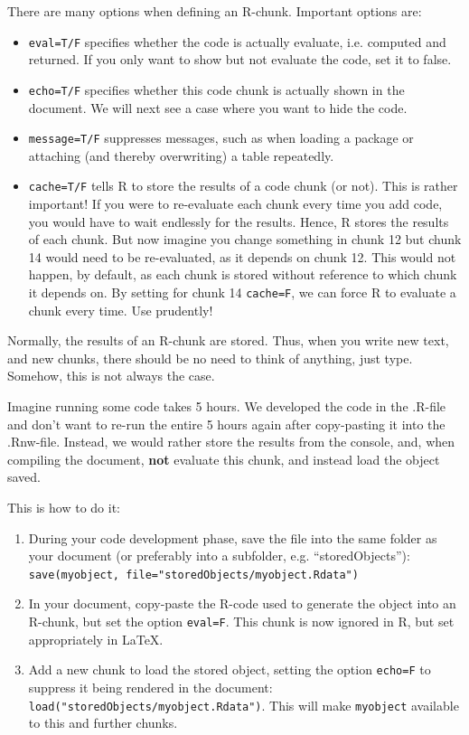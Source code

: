 \documentclass[a4paper, 11pt]{article}\usepackage[]{graphicx}\usepackage[]{color}
\begin{document}
There are many options when defining an R-chunk. Important options are:
\begin{itemize}
\item \texttt{eval=T/F} specifies whether the code is actually evaluate, i.e. computed and returned. If you only want to show but not evaluate the code, set it to false.
\item \texttt{echo=T/F} specifies whether this code chunk is actually shown in the document. We will next see a case where you want to hide the code.
\item \texttt{message=T/F} suppresses messages, such as when loading a package or attaching (and thereby overwriting) a table repeatedly.
\item \texttt{cache=T/F} tells R to store the results of a code chunk (or not). This is rather important! If you were to re-evaluate each chunk every time you add code, you would have to wait endlessly for the results. Hence, R stores the results of each chunk. But now imagine you change something in chunk 12 but chunk 14 would need to be re-evaluated, as it depends on chunk 12. This would not happen, by default, as each chunk is stored without reference to which chunk it depends on. By setting for chunk 14 \texttt{cache=F}, we can force R to evaluate a chunk every time. Use prudently!
\end{itemize}

Normally, the results of an R-chunk are stored. Thus, when you write new text, and new chunks, there should be no need to think of anything, just type. Somehow, this is not always the case. 

Imagine running some code takes 5 hours. We developed the code in the .R-file and don't want to re-run the entire 5 hours again after copy-pasting it into the .Rnw-file. Instead, we would rather store the results from the console, and, when compiling the document, \textbf{not} evaluate this chunk, and instead load the object saved.

This is how to do it: 
\begin{enumerate}
\item During your code development phase, save the file into the same folder as your document (or preferably into a subfolder, e.g. ``storedObjects''): \nolinkurl{save(myobject, file="storedObjects/myobject.Rdata")}
\item In your document, copy-paste the R-code used to generate the object into an R-chunk, but set the option \texttt{eval=F}. This chunk is now ignored in R, but set appropriately in \LaTeX.
\item Add a new chunk to load the stored object, setting the option \texttt{echo=F} to suppress it being rendered in the document: \nolinkurl{load("storedObjects/myobject.Rdata")}. This will make \texttt{myobject} available to this and further chunks.


\end{enumerate}
\end{document}
